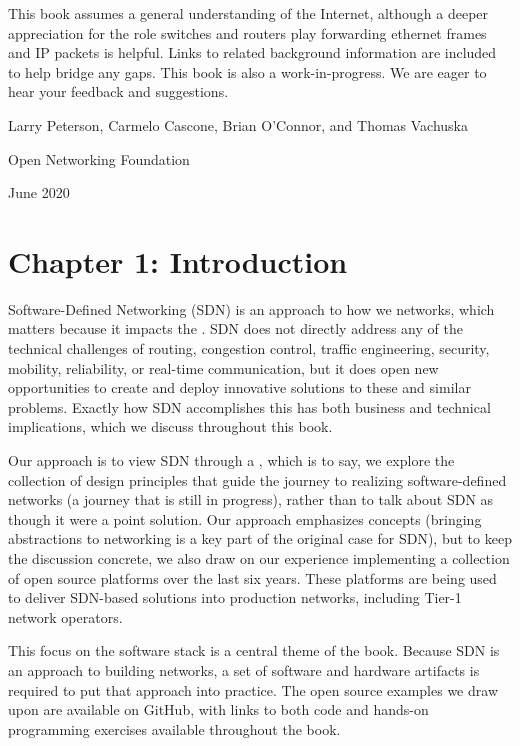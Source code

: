 \documentclass[letterpaper,11pt,english]{sphinxmanual}
\begin{document}
This book assumes a general understanding of the Internet, although a
deeper appreciation for the role switches and routers play forwarding
ethernet frames and IP packets is helpful. Links to related background
information are included to help bridge any gaps. This book is also a
work-in-progress. We are eager to hear your feedback and suggestions.

\begin{DUlineblock}{0em}
\item[] Larry Peterson, Carmelo Cascone, Brian O’Connor, and Thomas Vachuska
\item[] Open Networking Foundation
\item[] June 2020
\end{DUlineblock}


\chapter{Chapter 1:  Introduction}
\label{\detokenize{intro:chapter-1-introduction}}\label{\detokenize{intro::doc}}
Software-Defined Networking (SDN) is an approach to how we 
networks, which matters because it impacts the . SDN does not directly address any of the technical
challenges of routing, congestion control, traffic engineering,
security, mobility, reliability, or real-time communication, but it
does open new opportunities to create and deploy innovative solutions
to these and similar problems. Exactly how SDN accomplishes this has
both business and technical implications, which we discuss throughout
this book.

Our approach is to view SDN through a , which is to say,
we explore the collection of design principles that guide the journey
to realizing software-defined networks (a journey that is still in
progress), rather than to talk about SDN as though it were a point
solution. Our approach emphasizes concepts (bringing abstractions to
networking is a key part of the original case for SDN), but to keep
the discussion concrete, we also draw on our experience implementing a
collection of open source platforms over the last six years. These
platforms are being used to deliver SDN-based solutions into
production networks, including Tier-1 network operators.

This focus on the software stack is a central theme of the
book. Because SDN is an approach to building networks, a set of
software and hardware artifacts is required to put that approach into
practice.  The open source examples we draw upon are available on
GitHub, with links to both code and hands-on programming exercises
available throughout the book.
\end{document}
